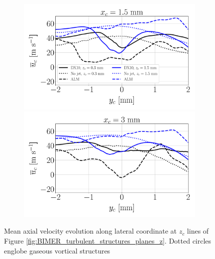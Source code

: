 \begin{figure}[ht]
\centering
\begin{subfigure}[b]{1.0\textwidth}
	\centering
   \includegraphics[scale=0.24]{./part3_applications/figures_ch9_lagrangian/gas_field_initial_conditions/lines_iso_x_along_y_plane_x01p5mm}
   \includegraphics[scale=0.24]{./part3_applications/figures_ch9_lagrangian/gas_field_initial_conditions/lines_iso_x_along_y_plane_x03mm}
\end{subfigure}
   \caption[{Mean axial velocity evolution along lateral coordinate at $z_c$ lines of Figure \ref{fig:BIMER_turbulent_structures_planes_z}}]{Mean axial velocity evolution along lateral coordinate at $z_c$ lines of Figure \ref{fig:BIMER_turbulent_structures_planes_z}. Dotted circles englobe gaseous vortical structures}
\label{fig:BIMER_LGS_lines_iso-x_along_y_ux_mean}
\end{figure}



